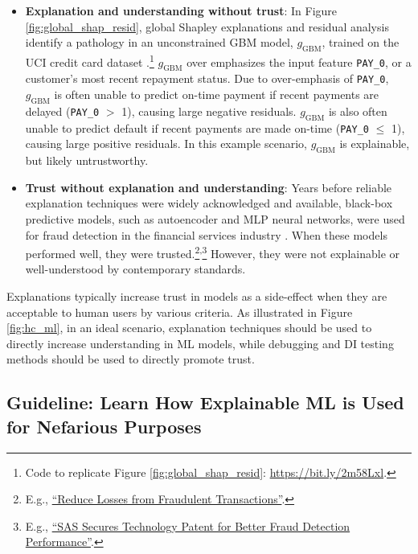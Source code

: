 \documentclass{article}
\begin{document}
\begin{itemize}

\item \textbf{Explanation and understanding without trust}: In Figure \ref{fig:global_shap_resid}, global Shapley explanations and residual analysis identify a pathology in an unconstrained GBM model, $g_{\text{GBM}}$, trained on the UCI credit card dataset \cite{uci}.\footnote{\scriptsize{Code to replicate Figure \ref{fig:global_shap_resid}: \url{https://bit.ly/2m58Lxl}.}} $g_{\text{GBM}}$ over emphasizes the input feature \texttt{PAY\_0}, or a customer's most recent repayment status. Due to over-emphasis of \texttt{PAY\_0}, $g_{\text{GBM}}$ is often unable to predict on-time payment if recent payments are delayed (\texttt{PAY\_0} $>$ 1), causing large negative residuals. $g_{\text{GBM}}$ is also often unable to predict default if recent payments are made on-time (\texttt{PAY\_0} $\leq$ 1), causing large positive residuals. In this example scenario, $g_{\text{GBM}}$ is explainable, but likely untrustworthy.

\item \textbf{Trust without explanation and understanding}: Years before reliable explanation techniques were widely acknowledged and available, black-box predictive models, such as autoencoder and MLP neural networks, were used for fraud detection in the financial services industry \cite{gopinathan1998fraud}. When these models performed well, they were trusted.\footnote{\scriptsize{E.g., \href{https://www.sas.com/en_ph/customers/hsbc.html}{``Reduce Losses from Fraudulent Transactions''}.}}\textsuperscript{,}\footnote{\scriptsize{E.g., \href{https://www.kdnuggets.com/2011/03/sas-patent-fraud-detection.html}{``SAS Secures Technology Patent for Better Fraud Detection Performance''}.}} However, they were not explainable or well-understood by contemporary standards.

\end{itemize}
Explanations typically increase trust in models as a side-effect when they are acceptable to human users by various criteria. As illustrated in Figure \ref{fig:hc_ml}, in an ideal scenario, explanation techniques should be used to directly increase understanding in ML models, while debugging and DI testing methods should be used to directly promote trust.

\subsection{Guideline: Learn How Explainable ML is Used for Nefarious Purposes}
\end{document}
